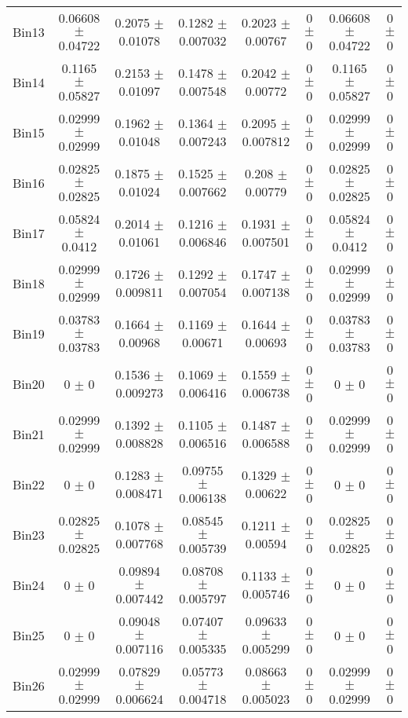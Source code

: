 \begin{tabular}{@{\extracolsep{4pt}}lccccccc@{}}
     Bin13 & 0.06608 $\pm$ 0.04722 & 0.2075 $\pm$ 0.01078 & 0.1282 $\pm$ 0.007032 & 0.2023 $\pm$ 0.00767 & 0 $\pm$ 0 & 0.06608 $\pm$ 0.04722 & 0 $\pm$ 0 \\ 
     Bin14 & 0.1165 $\pm$ 0.05827 & 0.2153 $\pm$ 0.01097 & 0.1478 $\pm$ 0.007548 & 0.2042 $\pm$ 0.00772 & 0 $\pm$ 0 & 0.1165 $\pm$ 0.05827 & 0 $\pm$ 0 \\ 
     Bin15 & 0.02999 $\pm$ 0.02999 & 0.1962 $\pm$ 0.01048 & 0.1364 $\pm$ 0.007243 & 0.2095 $\pm$ 0.007812 & 0 $\pm$ 0 & 0.02999 $\pm$ 0.02999 & 0 $\pm$ 0 \\ 
     Bin16 & 0.02825 $\pm$ 0.02825 & 0.1875 $\pm$ 0.01024 & 0.1525 $\pm$ 0.007662 & 0.208 $\pm$ 0.00779 & 0 $\pm$ 0 & 0.02825 $\pm$ 0.02825 & 0 $\pm$ 0 \\ 
     Bin17 & 0.05824 $\pm$ 0.0412 & 0.2014 $\pm$ 0.01061 & 0.1216 $\pm$ 0.006846 & 0.1931 $\pm$ 0.007501 & 0 $\pm$ 0 & 0.05824 $\pm$ 0.0412 & 0 $\pm$ 0 \\ 
     Bin18 & 0.02999 $\pm$ 0.02999 & 0.1726 $\pm$ 0.009811 & 0.1292 $\pm$ 0.007054 & 0.1747 $\pm$ 0.007138 & 0 $\pm$ 0 & 0.02999 $\pm$ 0.02999 & 0 $\pm$ 0 \\ 
     Bin19 & 0.03783 $\pm$ 0.03783 & 0.1664 $\pm$ 0.00968 & 0.1169 $\pm$ 0.00671 & 0.1644 $\pm$ 0.00693 & 0 $\pm$ 0 & 0.03783 $\pm$ 0.03783 & 0 $\pm$ 0 \\ 
     Bin20 & 0 $\pm$ 0 & 0.1536 $\pm$ 0.009273 & 0.1069 $\pm$ 0.006416 & 0.1559 $\pm$ 0.006738 & 0 $\pm$ 0 & 0 $\pm$ 0 & 0 $\pm$ 0 \\ 
     Bin21 & 0.02999 $\pm$ 0.02999 & 0.1392 $\pm$ 0.008828 & 0.1105 $\pm$ 0.006516 & 0.1487 $\pm$ 0.006588 & 0 $\pm$ 0 & 0.02999 $\pm$ 0.02999 & 0 $\pm$ 0 \\ 
     Bin22 & 0 $\pm$ 0 & 0.1283 $\pm$ 0.008471 & 0.09755 $\pm$ 0.006138 & 0.1329 $\pm$ 0.00622 & 0 $\pm$ 0 & 0 $\pm$ 0 & 0 $\pm$ 0 \\ 
     Bin23 & 0.02825 $\pm$ 0.02825 & 0.1078 $\pm$ 0.007768 & 0.08545 $\pm$ 0.005739 & 0.1211 $\pm$ 0.00594 & 0 $\pm$ 0 & 0.02825 $\pm$ 0.02825 & 0 $\pm$ 0 \\ 
     Bin24 & 0 $\pm$ 0 & 0.09894 $\pm$ 0.007442 & 0.08708 $\pm$ 0.005797 & 0.1133 $\pm$ 0.005746 & 0 $\pm$ 0 & 0 $\pm$ 0 & 0 $\pm$ 0 \\ 
     Bin25 & 0 $\pm$ 0 & 0.09048 $\pm$ 0.007116 & 0.07407 $\pm$ 0.005335 & 0.09633 $\pm$ 0.005299 & 0 $\pm$ 0 & 0 $\pm$ 0 & 0 $\pm$ 0 \\ 
     Bin26 & 0.02999 $\pm$ 0.02999 & 0.07829 $\pm$ 0.006624 & 0.05773 $\pm$ 0.004718 & 0.08663 $\pm$ 0.005023 & 0 $\pm$ 0 & 0.02999 $\pm$ 0.02999 & 0 $\pm$ 0 \\ 

\end{tabular}
